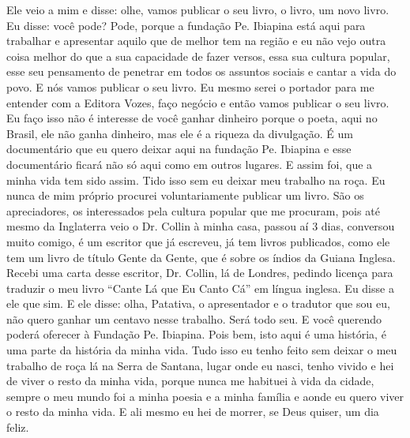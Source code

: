 Ele veio a mim e disse: olhe, vamos publicar o seu livro, o livro, um
novo livro. Eu disse: você pode? Pode, porque a fundação Pe. Ibiapina
está aqui para trabalhar e apresentar aquilo que de melhor tem na região
e eu não vejo outra coisa melhor do que a sua capacidade de fazer
versos, essa sua cultura popular, esse seu pensamento de penetrar em
todos os assuntos sociais e cantar a vida do povo. E nós vamos publicar
o seu livro. Eu mesmo serei o portador para me entender com a Editora
Vozes, faço negócio e então vamos publicar o seu livro. Eu faço isso
não é interesse de você ganhar dinheiro porque o poeta, aqui no Brasil,
ele não ganha dinheiro, mas ele é a riqueza da divulgação. É um
documentário que eu quero deixar aqui na fundação Pe. Ibiapina e esse
documentário ficará não só aqui como em outros lugares. E assim foi, que
a minha vida tem sido assim. Tido isso sem eu deixar meu trabalho na
roça. Eu nunca de mim próprio procurei voluntariamente publicar um
livro. São os apreciadores, os interessados pela cultura popular que me
procuram, pois até mesmo da Inglaterra veio o Dr. Collin à minha casa,
passou aí 3 dias, conversou muito comigo, é um escritor que já escreveu,
já tem livros publicados, como ele tem um livro de título Gente da
Gente, que é sobre os índios da Guiana Inglesa. Recebi uma carta desse
escritor, Dr. Collin, lá de Londres, pedindo licença para traduzir o meu
livro ``Cante Lá que Eu Canto Cá'' em língua inglesa. Eu disse a ele que
sim. E ele disse: olha, Patativa, o apresentador e o tradutor que sou
eu, não quero ganhar um centavo nesse trabalho. Será todo seu.
E você querendo poderá oferecer à Fundação Pe. Ibiapina. Pois bem, isto
aqui é uma história, é uma parte da história da minha vida. Tudo isso eu
tenho feito sem deixar o meu trabalho de roça lá na Serra de Santana,
lugar onde eu nasci, tenho vivido e hei de viver o resto da minha
vida, porque nunca me habituei à vida da cidade, sempre o meu mundo
foi a minha poesia e a minha família e aonde eu quero viver o resto da
minha vida. E ali mesmo eu hei de morrer, se Deus quiser, um dia feliz.

